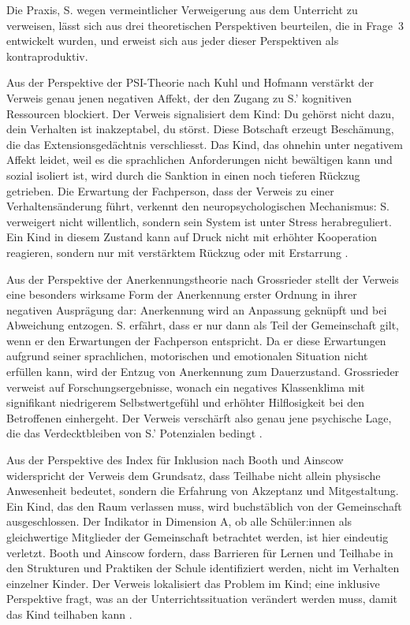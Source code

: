 \documentclass[ngerman, a4paper]{article}
\begin{document}
Die Praxis, S. wegen vermeintlicher Verweigerung aus dem Unterricht zu verweisen,
lässt sich aus drei theoretischen Perspektiven beurteilen, die in Frage~3 entwickelt
wurden, und erweist sich aus jeder dieser Perspektiven als kontraproduktiv.

Aus der Perspektive der PSI-Theorie nach Kuhl und Hofmann verstärkt der Verweis
genau jenen negativen Affekt, der den Zugang zu S.' kognitiven Ressourcen blockiert.
Der Verweis signalisiert dem Kind: Du gehörst nicht dazu, dein Verhalten ist
inakzeptabel, du störst. Diese Botschaft erzeugt Beschämung, die das
Extensionsgedächtnis verschliesst. Das Kind, das ohnehin unter negativem Affekt
leidet, weil es die sprachlichen Anforderungen nicht bewältigen kann und sozial
isoliert ist, wird durch die Sanktion in einen noch tieferen Rückzug getrieben.
Die Erwartung der Fachperson, dass der Verweis zu einer Verhaltensänderung führt,
verkennt den neuropsychologischen Mechanismus: S. verweigert nicht willentlich,
sondern sein System ist unter Stress herabreguliert. Ein Kind in diesem Zustand
kann auf Druck nicht mit erhöhter Kooperation reagieren, sondern nur mit
verstärktem Rückzug oder mit Erstarrung \parencite{kuhl2019diversitaet}.

Aus der Perspektive der Anerkennungstheorie nach Grossrieder stellt der Verweis
eine besonders wirksame Form der Anerkennung erster Ordnung in ihrer negativen
Ausprägung dar: Anerkennung wird an Anpassung geknüpft und bei Abweichung
entzogen. S. erfährt, dass er nur dann als Teil der Gemeinschaft gilt, wenn er
den Erwartungen der Fachperson entspricht. Da er diese Erwartungen aufgrund
seiner sprachlichen, motorischen und emotionalen Situation nicht erfüllen kann,
wird der Entzug von Anerkennung zum Dauerzustand. Grossrieder verweist auf
Forschungsergebnisse, wonach ein negatives Klassenklima mit signifikant
niedrigerem Selbstwertgefühl und erhöhter Hilflosigkeit bei den Betroffenen
einhergeht. Der Verweis verschärft also genau jene psychische Lage, die das
Verdecktbleiben von S.' Potenzialen bedingt
\parencite{grossrieder2010anerkennung}.

Aus der Perspektive des Index für Inklusion nach Booth und Ainscow widerspricht
der Verweis dem Grundsatz, dass Teilhabe nicht allein physische Anwesenheit
bedeutet, sondern die Erfahrung von Akzeptanz und Mitgestaltung. Ein Kind, das
den Raum verlassen muss, wird buchstäblich von der Gemeinschaft ausgeschlossen.
Der Indikator in Dimension A, ob alle Schüler:innen als gleichwertige Mitglieder
der Gemeinschaft betrachtet werden, ist hier eindeutig verletzt. Booth und Ainscow
fordern, dass Barrieren für Lernen und Teilhabe in den Strukturen und Praktiken
der Schule identifiziert werden, nicht im Verhalten einzelner Kinder. Der Verweis
lokalisiert das Problem im Kind; eine inklusive Perspektive fragt, was an der
Unterrichtssituation verändert werden muss, damit das Kind teilhaben kann
\parencite{booth2019index}.
\end{document}
